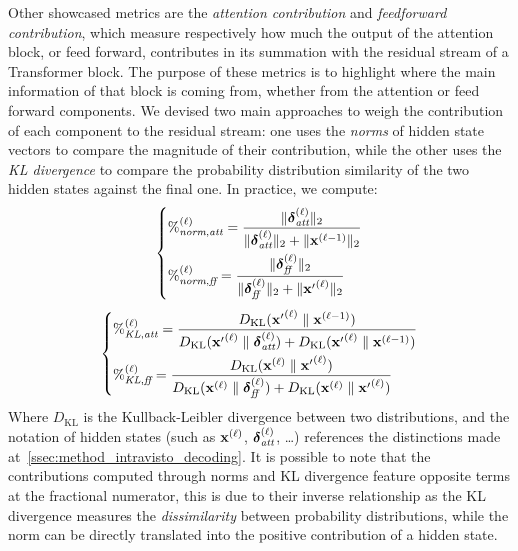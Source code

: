 Other showcased metrics are the \emph{attention contribution} and \emph{feedforward contribution}, which measure respectively how much the output of the attention block, or feed forward, contributes in its summation with the residual stream of a Transformer block.
The purpose of these metrics is to highlight where the main information of that block is coming from, whether from the attention or feed forward components.
We devised two main approaches to weigh the contribution of each component to the residual stream: one uses the \emph{norms} of hidden state vectors to compare the magnitude of their contribution, while the other uses the \emph{KL divergence} to compare the probability distribution similarity of the two hidden states against the final one.
In practice, we compute:
\begin{equation}
    \left\{
    \begin{aligned}
        &{\%}^{(\ell)}_{\textit{norm},\textit{att}} = \frac{\|\bm{\mathbf{\delta}}_\textit{att}^{(\ell)}\|_2}{\|\bm{\mathbf{\delta}}_\textit{att}^{(\ell)}\|_2 + \|\bm{\mathbf{x}}^{(\ell-1)}\|_2} \\
        &{\%}^{(\ell)}_{\textit{norm},\textit{ff}} = \frac{\|\bm{\mathbf{\delta}}_\textit{ff}^{(\ell)}\|_2}{\|\bm{\mathbf{\delta}}_\textit{ff}^{(\ell)}\|_2 + \|{\bm{\mathbf{x}}'}^{(\ell)}\|_2} \label{eq:method_intravisto_norm-contrib}
    \end{aligned}
    \right.
\end{equation}
\begin{equation}
    \left\{
    \begin{aligned}
        &{\%}^{(\ell)}_{\textit{KL},\textit{att}} = \frac{D_{\text{KL}}({\bm{\mathbf{x}}'}^{(\ell)} \parallel \bm{\mathbf{x}}^{(\ell-1)})}{D_{\text{KL}}({\bm{\mathbf{x}}'}^{(\ell)} \parallel \bm{\mathbf{\delta}}_\textit{att}^{(\ell)}) + D_{\text{KL}}({\bm{\mathbf{x}}'}^{(\ell)} \parallel \bm{\mathbf{x}}^{(\ell-1)})} \\
        &{\%}^{(\ell)}_{\textit{KL},\textit{ff}} = \frac{D_{\text{KL}}(\bm{\mathbf{x}}^{(\ell)} \parallel {\bm{\mathbf{x}}'}^{(\ell)})}{D_{\text{KL}}(\bm{\mathbf{x}}^{(\ell)} \parallel \bm{\mathbf{\delta}}_\textit{ff}^{(\ell)}) + D_{\text{KL}}(\bm{\mathbf{x}}^{(\ell)} \parallel {\bm{\mathbf{x}}'}^{(\ell)})} \label{eq:method_intravisto_kl-contrib}
    \end{aligned}
    \right.
\end{equation}
Where $D_{\text{KL}}$ is the Kullback-Leibler divergence between two distributions, and the notation of hidden states (such as $\bm{\mathbf{x}}^{(\ell)}$, $\bm{\mathbf{\delta}}_\textit{att}^{(\ell)}$, \ldots) references the distinctions made at~\cref{ssec:method_intravisto_decoding}.
It is possible to note that the contributions computed through norms and KL divergence feature opposite terms at the fractional numerator, this is due to their inverse relationship as the KL divergence measures the \emph{dissimilarity} between probability distributions, while the norm can be directly translated into the positive contribution of a hidden state. 

